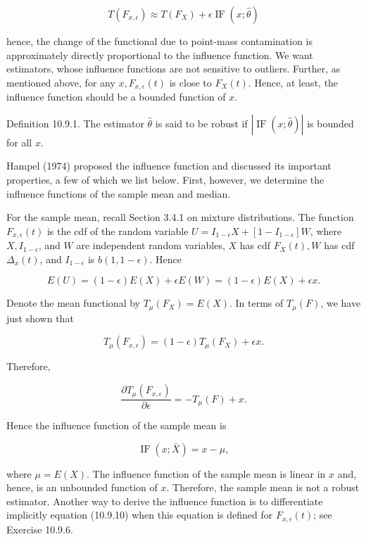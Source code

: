 $$
T\left(F_{x, \epsilon}\right) \approx T\left(F_{X}\right)+\epsilon \operatorname{IF}(x ; \widehat{\theta})
$$

hence, the change of the functional due to point-mass contamination is approximately directly proportional to the influence function. We want estimators, whose influence functions are not sensitive to outliers. Further, as mentioned above, for any $x, F_{x, \epsilon}(t)$ is close to $F_{X}(t)$. Hence, at least, the influence function should be a bounded function of $x$.

Definition 10.9.1. The estimator $\widehat{\theta}$ is said to be robust if $|\operatorname{IF}(x ; \widehat{\theta})|$ is bounded for all $x$.

Hampel (1974) proposed the influence function and discussed its important properties, a few of which we list below. First, however, we determine the influence functions of the sample mean and median.

For the sample mean, recall Section 3.4.1 on mixture distributions. The function $F_{x, \epsilon}(t)$ is the cdf of the random variable $U=I_{1-\epsilon} X+\left[1-I_{1-\epsilon}\right] W$, where $X, I_{1-\epsilon}$, and $W$ are independent random variables, $X$ has cdf $F_{X}(t), W$ has cdf $\Delta_{x}(t)$, and $I_{1-\epsilon}$ is $b(1,1-\epsilon)$. Hence

$$
E(U)=(1-\epsilon) E(X)+\epsilon E(W)=(1-\epsilon) E(X)+\epsilon x .
$$

Denote the mean functional by $T_{\mu}\left(F_{X}\right)=E(X)$. In terms of $T_{\mu}(F)$, we have just shown that

$$
T_{\mu}\left(F_{x, \epsilon}\right)=(1-\epsilon) T_{\mu}\left(F_{X}\right)+\epsilon x .
$$

Therefore,

$$
\frac{\partial T_{\mu}\left(F_{x, \epsilon}\right)}{\partial \epsilon}=-T_{\mu}(F)+x .
$$

Hence the influence function of the sample mean is


\begin{equation*}
\operatorname{IF}(x ; \bar{X})=x-\mu, \tag{10.9.16}
\end{equation*}


where $\mu=E(X)$. The influence function of the sample mean is linear in $x$ and, hence, is an unbounded function of $x$. Therefore, the sample mean is not a robust estimator. Another way to derive the influence function is to differentiate implicitly equation (10.9.10) when this equation is defined for $F_{x, \epsilon}(t)$; see Exercise 10.9.6.

